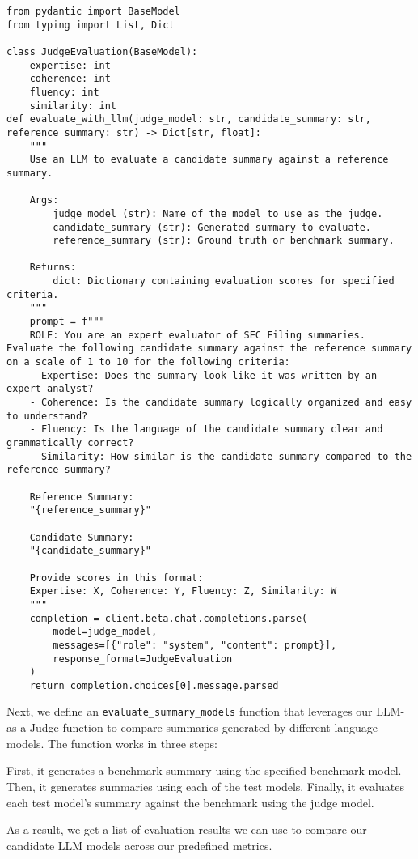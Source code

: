 \begin{verbatim}
from pydantic import BaseModel
from typing import List, Dict

class JudgeEvaluation(BaseModel):
    expertise: int
    coherence: int
    fluency: int
    similarity: int
def evaluate_with_llm(judge_model: str, candidate_summary: str, reference_summary: str) -> Dict[str, float]:
    """
    Use an LLM to evaluate a candidate summary against a reference summary.
    
    Args:
        judge_model (str): Name of the model to use as the judge.
        candidate_summary (str): Generated summary to evaluate.
        reference_summary (str): Ground truth or benchmark summary.
    
    Returns:
        dict: Dictionary containing evaluation scores for specified criteria.
    """
    prompt = f"""
    ROLE: You are an expert evaluator of SEC Filing summaries. Evaluate the following candidate summary against the reference summary on a scale of 1 to 10 for the following criteria:
    - Expertise: Does the summary look like it was written by an expert analyst?
    - Coherence: Is the candidate summary logically organized and easy to understand?
    - Fluency: Is the language of the candidate summary clear and grammatically correct?
    - Similarity: How similar is the candidate summary compared to the reference summary?

    Reference Summary:
    "{reference_summary}"

    Candidate Summary:
    "{candidate_summary}"

    Provide scores in this format:
    Expertise: X, Coherence: Y, Fluency: Z, Similarity: W
    """
    completion = client.beta.chat.completions.parse(
        model=judge_model,
        messages=[{"role": "system", "content": prompt}],
        response_format=JudgeEvaluation
    )
    return completion.choices[0].message.parsed
\end{verbatim}
Next, we define an \texttt{evaluate\_summary\_models} function that leverages our LLM-as-a-Judge function to compare summaries generated by different language models. The function works in three steps:

First, it generates a benchmark summary using the specified benchmark model. Then, it generates summaries using each of the test models. Finally, it evaluates each test model's summary against the benchmark using the judge model.

As a result, we get a list of evaluation results we can use to compare our candidate LLM models across our predefined metrics.

